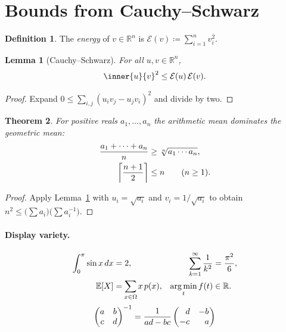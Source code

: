 \documentclass[10pt]{article}
\newtheorem{theorem}{Theorem}
\newtheorem{lemma}[theorem]{Lemma}
\theoremstyle{definition}
\newtheorem{definition}{Definition}
\DeclarePairedDelimiter{\ceil}{\lceil}{\rceil}
\begin{document}
\section{Bounds from Cauchy--Schwarz}
\begin{definition}
The \emph{energy} of $v\in\mathbb{R}^{n}$ is $\mathcal{E}(v)\coloneqq\sum_{i=1}^{n}v_i^{2}$.
\end{definition}
\begin{lemma}[Cauchy--Schwarz]\label{lem:cs}
For all $u,v\in\mathbb{R}^{n}$,
\begin{equation}
  \inner{u}{v}^{2}\le \mathcal{E}(u)\,\mathcal{E}(v).
\end{equation}
\end{lemma}
\begin{proof}
Expand $0\le\sum_{i,j}(u_iv_j-u_jv_i)^{2}$ and divide by two.
\end{proof}
\begin{theorem}\label{thm:mean}
For positive reals $a_1,\dots,a_n$ the arithmetic mean dominates the geometric mean:
\begin{align}
  \frac{a_1+\dotsb+a_n}{n} &\ge \sqrt[n]{a_1\cdots a_n},\\
  \ceil*{\frac{n+1}{2}} &\le n \qquad (n\ge1).
\end{align}
\end{theorem}
\begin{proof}
Apply Lemma~\ref{lem:cs} with $u_i=\sqrt{a_i}$ and $v_i=1/\sqrt{a_i}$ to obtain
$n^{2}\le\bigl(\sum a_i\bigr)\bigl(\sum a_i^{-1}\bigr)$.
\end{proof}

\paragraph{Display variety.}
\begin{alignat*}{2}
  \int_0^{\pi}\sin x\,dx &= 2, &\qquad \sum_{k=1}^{\infty}\frac{1}{k^{2}} &= \frac{\pi^{2}}{6},\\
  \mathbb{E}[X] &= \smashoperator{\sum_{x\in\Omega}}x\,p(x), & \operatorname*{arg\,min}_{t} f(t) &\in \mathbb{R}.
\end{alignat*}
\[
  \begin{pmatrix} a & b\\ c & d\end{pmatrix}^{-1}
  =\frac{1}{ad-bc}\begin{pmatrix}\hphantom{-}d & -b\\ -c & \hphantom{-}a\end{pmatrix}
\]
\end{document}
